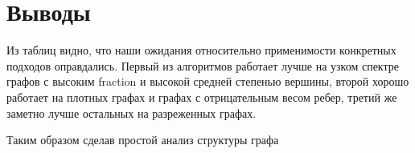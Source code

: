\FloatBarrier
\section{Выводы}

Из таблиц видно, что наши ожидания относительно применимости конкретных подходов оправдались. Первый из алгоритмов работает лучше на узком спектре графов с высоким fraction и высокой средней степенью вершины, второй хорошо работает на плотных графах и графах с отрицательным весом ребер, третий же заметно лучше остальных на разреженных графах.

Таким образом сделав простой анализ структуры графа 
\FloatBarrier
